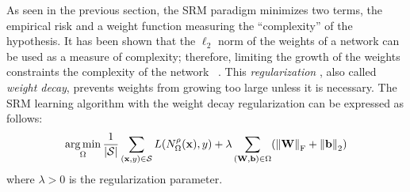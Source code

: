 As seen in the previous section, the SRM paradigm minimizes two terms, the empirical risk and a weight function measuring the ``complexity'' of the hypothesis.
It has been shown that the $\ell_2$ norm of the weights of a network can be used as a measure of complexity; therefore, limiting the growth of the weights constraints the complexity of the network ~\cite{hinton1987learning}.
This \emph{regularization} \cite{tikhonov1977solutions,krogh1992simple}, also called \emph{weight decay}, prevents weights from growing too large unless it is necessary.
The SRM learning algorithm with the weight decay regularization can be expressed as follows:
\begin{equation}
  \argmin_{\Omega} \frac{1}{|\mathcal{S}|} \sum_{(\xvec, y) \in \mathcal{S}} L(N^\rho_\Omega(\xvec), y) + \lambda \sum_{(\Wmat, \bvec) \in \Omega} \left( \norm{\Wmat}_\mathrm{F} + \norm{\bvec}_\mathrm{2} \right)
\end{equation}
where $\lambda > 0$ is the regularization parameter.



